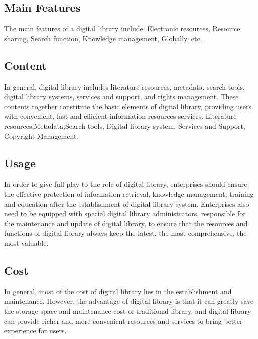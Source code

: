 \subsection{Main Features}
The main features of a digital library include:
Electronic resources, Resource sharing, Search function, Knowledge management, Globally, etc.

\subsection{Content}
In general, digital library includes literature resources, metadata, search tools, digital library systems, services and support, and rights management. These contents together constitute the basic elements of digital library, providing users with convenient, fast and efficient information resources services.
Literature resources,Metadata,Search tools, Digital library system, Services and Support, Copyright Management.

\subsection{Usage}
In order to give full play to the role of digital library, enterprises should ensure the effective protection of information retrieval, knowledge management, training and education after the establishment of digital library system. Enterprises also need to be equipped with special digital library administrators, responsible for the maintenance and update of digital library, to ensure that the resources and functions of digital library always keep the latest, the most comprehensive, the most valuable.

\subsection{Cost}
In general, most of the cost of digital library lies in the establishment and maintenance. However, the advantage of digital library is that it can greatly save the storage space and maintenance cost of traditional library, and digital library can provide richer and more convenient resources and services to bring better experience for users.
 
